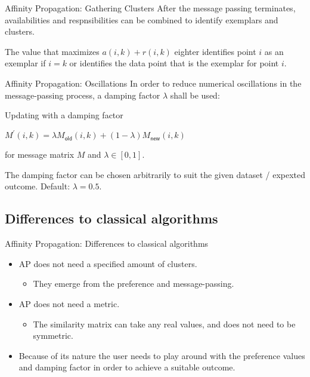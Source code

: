 \documentclass{beamer}
\begin{document}
\begin{frame}{Affinity Propagation: Gathering Clusters}
	After the message passing terminates, \alert{availabilities} and \alert{respnsibilities} can be combined to identify \alert{exemplars} and clusters.
	
	The value that maximizes $a(i,k) + r(i,k)$ eighter identifies point $i$ as an \alert{exemplar} if $i=k$ or identifies the data point that is the \alert{exemplar} for point $i$.
\end{frame}
\begin{frame}{Affinity Propagation: Oscillations}
	In order to reduce numerical oscillations in the message-passing process, a damping factor $\lambda$ shall be used:
	\begin{block}{Updating with a damping factor}
		\begin{center}
			$M^\prime (i,k) =\lambda M_{\mathsf{old}}(i,k) + (1-\lambda) M_{\mathsf{new}} (i,k)$
		\end{center}
	\end{block}
	 for message matrix $M$ and $\lambda\in\left[ 0,1\right]$.
	
	The damping factor can be chosen arbitrarily to suit the given dataset / expexted outcome. Default: $\lambda = 0.5$.
\end{frame}

\subsection{Differences to classical algorithms}
\begin{frame}{Affinity Propagation: Differences to classical algorithms}
	\begin{itemize}
		\item AP does not need a specified amount of clusters.
		\begin{itemize}
			\item They emerge from the preference and message-passing.
		\end{itemize}
		\item AP does not need a metric.
		\begin{itemize}
			\item The \alert{similarity matrix} can take any real values, and does not need to be symmetric.
		\end{itemize}
		\item Because of its nature the user needs to play around with the \alert{preference values} and \alert{damping factor} in order to achieve a suitable outcome.
	\end{itemize}
\end{frame}
\end{document}
